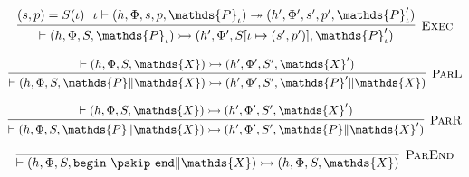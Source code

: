\[
\infer[\textsc{Exec}]
{
	\vdash (h, \Phi, S, \mathds{P}_\iota)
	\rightarrowtail
	(h', \Phi', S[\iota \mapsto (s', p')], \mathds{P}_\iota')
}
{
	(s, p) = S(\iota)\ \
	\iota \vdash (h, \Phi, s, p, \mathds{P}_\iota)
	\twoheadrightarrow
	(h', \Phi', s', p', \mathds{P}_\iota')
}
\]

\[
\infer[\textsc{ParL}]
{
	\vdash (h, \Phi, S, \mathds{P} \| \mathds{X})
	\rightarrowtail
	(h', \Phi', S', \mathds{P}' \| \mathds{X})
}
{
	\vdash (h, \Phi, S, \mathds{X})
	\rightarrowtail
	(h', \Phi', S', \mathds{X}')
}
\]

\[
\infer[\textsc{ParR}]
{
	\vdash (h, \Phi, S, \mathds{P} \| \mathds{X})
	\rightarrowtail
	(h', \Phi', S', \mathds{P} \| \mathds{X}')
}
{
	\vdash (h, \Phi, S, \mathds{X})
	\rightarrowtail
	(h', \Phi', S', \mathds{X}')
}
\]

\[
\infer[\textsc{ParEnd}]
{
	\vdash (h, \Phi, S, \mathtt{begin}\ \pskip\ \mathtt{end} \| \mathds{X})
	\rightarrowtail
	(h, \Phi, S, \mathds{X})
}
{}
\]